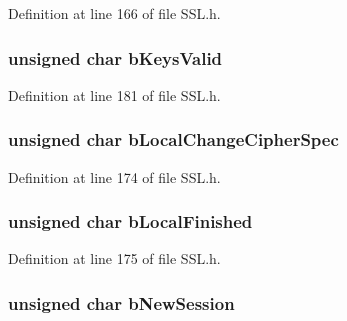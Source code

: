 Definition at line 166 of file S\+S\+L.\+h.

\hypertarget{struct_s_s_l___s_t_u_b_aef6c0bc7a70f91a780dbd3517493d09c}{}
\subsubsection[{b\+Keys\+Valid}]{\setlength{\rightskip}{0pt plus 5cm}unsigned char b\+Keys\+Valid}\label{struct_s_s_l___s_t_u_b_aef6c0bc7a70f91a780dbd3517493d09c}


Definition at line 181 of file S\+S\+L.\+h.

\hypertarget{struct_s_s_l___s_t_u_b_a012716356fcfa9a31c8f53696b8f0537}{}
\subsubsection[{b\+Local\+Change\+Cipher\+Spec}]{\setlength{\rightskip}{0pt plus 5cm}unsigned char b\+Local\+Change\+Cipher\+Spec}\label{struct_s_s_l___s_t_u_b_a012716356fcfa9a31c8f53696b8f0537}


Definition at line 174 of file S\+S\+L.\+h.

\hypertarget{struct_s_s_l___s_t_u_b_a055539520ae64ed8feed987565218109}{}
\subsubsection[{b\+Local\+Finished}]{\setlength{\rightskip}{0pt plus 5cm}unsigned char b\+Local\+Finished}\label{struct_s_s_l___s_t_u_b_a055539520ae64ed8feed987565218109}


Definition at line 175 of file S\+S\+L.\+h.

\hypertarget{struct_s_s_l___s_t_u_b_a5f6cafb73fd774b7debcea58930a81a8}{}
\subsubsection[{b\+New\+Session}]{\setlength{\rightskip}{0pt plus 5cm}unsigned char b\+New\+Session}\label{struct_s_s_l___s_t_u_b_a5f6cafb73fd774b7debcea58930a81a8}


